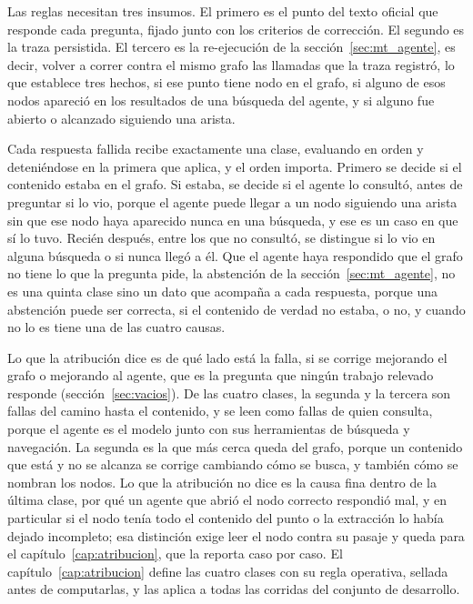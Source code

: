 \documentclass[12pt,a4paper]{report}
\begin{document}
Las reglas necesitan tres insumos. El primero es el punto del texto oficial que responde cada pregunta, fijado junto con los criterios de corrección. El segundo es la traza persistida. El tercero es la re-ejecución de la sección~\ref{sec:mt_agente}, es decir, volver a correr contra el mismo grafo las llamadas que la traza registró, lo que establece tres hechos, si ese punto tiene nodo en el grafo, si alguno de esos nodos apareció en los resultados de una búsqueda del agente, y si alguno fue abierto o alcanzado siguiendo una arista. 

Cada respuesta fallida recibe exactamente una clase, evaluando en orden y deteniéndose en la primera que aplica, y el orden importa. Primero se decide si el contenido estaba en el grafo. Si estaba, se decide si el agente lo consultó, antes de preguntar si lo vio, porque el agente puede llegar a un nodo siguiendo una arista sin que ese nodo haya aparecido nunca en una búsqueda, y ese es un caso en que sí lo tuvo. Recién después, entre los que no consultó, se distingue si lo vio en alguna búsqueda o si nunca llegó a él. Que el agente haya respondido que el grafo no tiene lo que la pregunta pide, la abstención de la sección~\ref{sec:mt_agente}, no es una quinta clase sino un dato que acompaña a cada respuesta, porque una abstención puede ser correcta, si el contenido de verdad no estaba, o no, y cuando no lo es tiene una de las cuatro causas.

Lo que la atribución dice es de qué lado está la falla, si se corrige mejorando el grafo o mejorando al agente, que es la pregunta que ningún trabajo relevado responde (sección~\ref{sec:vacios}). De las cuatro clases, la segunda y la tercera son fallas del camino hasta el contenido, y se leen como fallas de quien consulta, porque el agente es el modelo junto con sus herramientas de búsqueda y navegación. La segunda es la que más cerca queda del grafo, porque un contenido que está y no se alcanza se corrige cambiando cómo se busca, y también cómo se nombran los nodos. Lo que la atribución no dice es la causa fina dentro de la última clase, por qué un agente que abrió el nodo correcto respondió mal, y en particular si el nodo tenía todo el contenido del punto o la extracción lo había dejado incompleto; esa distinción exige leer el nodo contra su pasaje y queda para el capítulo~\ref{cap:atribucion}, que la reporta caso por caso. El capítulo~\ref{cap:atribucion} define las cuatro clases con su regla operativa, sellada antes de computarlas, y las aplica a todas las corridas del conjunto de desarrollo.
\end{document}

